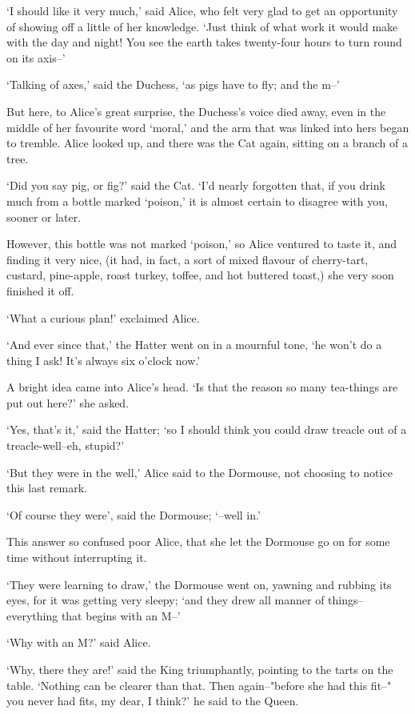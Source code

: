 \documentclass[statementpaper,twoside,openany]{memoir}
\begin{document}
`I should like it very much,' said Alice, who felt very glad to get an opportunity of showing off a little of her knowledge. `Just think of what work it would make with the day and night! You see the earth takes twenty-four hours to turn round on its axis--'

`Talking of axes,' said the Duchess, `as pigs have to fly; and the m--'

But here, to Alice's great surprise, the Duchess's voice died away, even in the middle of her favourite word `moral,' and the arm that was linked into hers began to tremble. Alice looked up, and there was the Cat again, sitting on a branch of a tree.

`Did you say pig, or fig?' said the Cat. `I'd nearly forgotten that, if you drink much from a bottle marked `poison,' it is almost certain to disagree with you, sooner or later.

However, this bottle was not marked `poison,' so Alice ventured to taste it, and finding it very nice, (it had, in fact, a sort of mixed flavour of cherry-tart, custard, pine-apple, roast turkey, toffee, and hot buttered toast,) she very soon finished it off.

`What a curious plan!' exclaimed Alice.

`And ever since that,' the Hatter went on in a mournful tone, `he won't do a thing I ask! It's always six o'clock now.'

A bright idea came into Alice's head. `Is that the reason so many tea-things are put out here?' she asked.

`Yes, that's it,' said the Hatter; `so I should think you could draw treacle out of a treacle-well--eh, stupid?'

`But they were in the well,' Alice said to the Dormouse, not choosing to notice this last remark.

`Of course they were', said the Dormouse; `--well in.'

This answer so confused poor Alice, that she let the Dormouse go on for some time without interrupting it.

`They were learning to draw,' the Dormouse went on, yawning and rubbing its eyes, for it was getting very sleepy; `and they drew all manner of things--everything that begins with an M--'

`Why with an M?' said Alice.

`Why, there they are!' said the King triumphantly, pointing to the tarts on the table. `Nothing can be clearer than that. Then again--"before she had this fit--" you never had fits, my dear, I think?' he said to the Queen.
\end{document}
